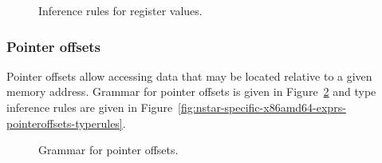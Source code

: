 \begin{figure}[H]
  \centering

  \begin{prooftree}
  \end{prooftree}

  \caption{Inference rules for register values.}
  \label{fig:nstar-specific-x86amd64-exprs-registers-typerules}
\end{figure}

\subsubsection{Pointer offsets}\label{fig:nstar-specific-x86amd64-exprs-pointeroffsets}

Pointer offsets allow accessing data that may be located relative to a given memory address.
Grammar for pointer offsets is given in Figure~\ref{fig:nstar-specific-x86amd64-exprs-pointeroffsets-grammar} and type inference rules are given in Figure~\ref{fig:nstar-specific-x86amd64-exprs-pointeroffsets-typerules}.

\begin{figure}[H]
  \centering


  \caption{Grammar for pointer offsets.}
  \label{fig:nstar-specific-x86amd64-exprs-pointeroffsets-grammar}
\end{figure}

